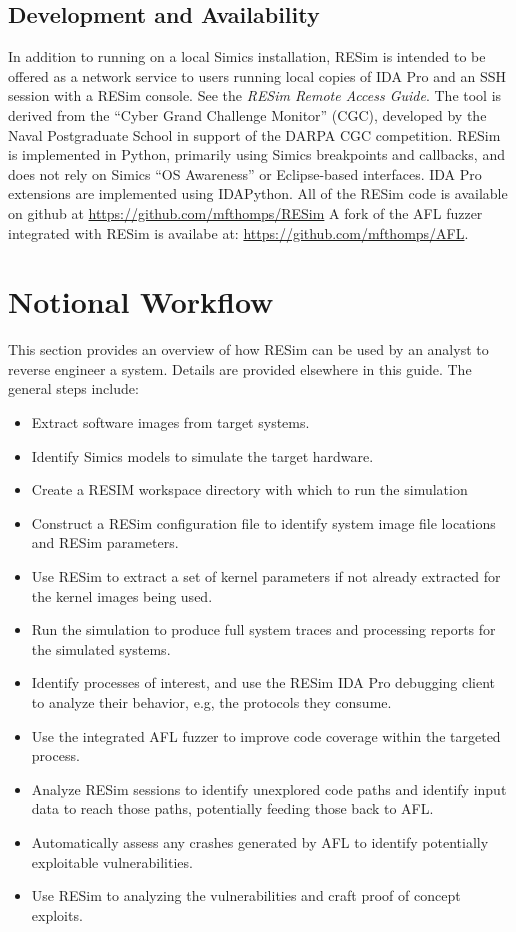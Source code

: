 \documentclass[titlepage]{article}
\begin{document}
\subsection{Development and Availability}
In addition to running on a local Simics installation, RESim is intended to be offered as a network service to users running local copies of IDA Pro and an SSH session with a RESim console.  See the \textit{RESim Remote Access Guide}.  The tool is derived from the “Cyber Grand Challenge Monitor” (CGC), developed by the Naval Postgraduate School in support of the DARPA CGC competition.  
RESim is implemented in Python, primarily using Simics breakpoints and callbacks, and does not rely on 
Simics “OS Awareness” or Eclipse-based interfaces.   IDA Pro extensions are implemented using IDAPython.  
All of the RESim code is available on github at \url{https://github.com/mfthomps/RESim}  A fork of the AFL fuzzer integrated with 
RESim is availabe at: \url{https://github.com/mfthomps/AFL}.


\section{Notional Workflow}
\label{workflow}
This section provides an overview of how RESim can be used by an analyst to reverse engineer a system. Details are provided elsewhere
in this guide.  The general steps include:
\begin{itemize}
\item Extract software images from target systems.
\item Identify Simics models to simulate the target hardware.
\item Create a RESIM workspace directory with which to run the simulation
\item Construct a RESim configuration file to identify system image file locations and RESim parameters.
\item Use RESim to extract a set of kernel parameters if not already extracted for the kernel images being used.
\item Run the simulation to produce full system traces and processing reports for the simulated systems.
\item Identify processes of interest, and use the RESim IDA Pro debugging client to analyze their behavior, e.g, the protocols they consume.
\item Use the integrated AFL fuzzer to improve code coverage within the targeted process.
\item Analyze RESim sessions to identify unexplored code paths and identify input data to reach those paths, potentially feeding those back to AFL.
\item Automatically assess any crashes generated by AFL to identify potentially exploitable vulnerabilities.
\item Use RESim to analyzing the vulnerabilities and craft proof of concept exploits.
\end{itemize}
\end{document}
